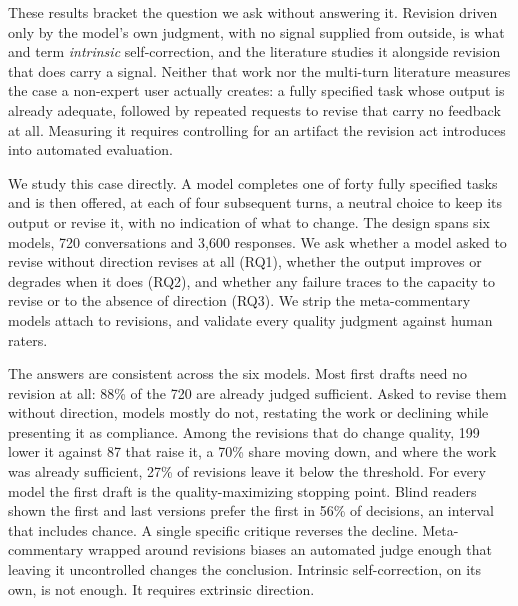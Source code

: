 These results bracket the question we ask without answering it. Revision driven only by the
model's own judgment, with no signal supplied from outside, is what
\citet{kamoi2024selfcorrection} and \citet{huang2024large} term \emph{intrinsic}
self-correction, and the literature studies it alongside revision that does carry a signal.
Neither that work nor the multi-turn literature measures the case a non-expert user
actually creates: a fully specified task whose output is already adequate, followed by
repeated requests to revise that carry no feedback at all. Measuring it requires
controlling for an artifact the revision act introduces into automated evaluation.

We study this case directly. A model completes one of forty fully specified tasks and is
then offered, at each of four subsequent turns, a neutral choice to keep its output or
revise it, with no indication of what to change. The design spans six models, 720
conversations and 3,600 responses. We ask whether a model asked to revise without direction
revises at all (RQ1), whether the output improves or degrades when it does (RQ2), and
whether any failure traces to the capacity to revise or to the absence of direction (RQ3).
We strip the meta-commentary models attach to revisions, and validate every quality
judgment against human raters.

The answers are consistent across the six models. Most first drafts need no revision at
all: 88\% of the 720 are already judged sufficient. Asked to revise them without direction,
models mostly do not, restating the work or declining while presenting it as compliance.
Among the revisions that do change quality, 199 lower it against 87 that raise it, a 70\%
share moving down, and where the work was already sufficient, 27\% of revisions leave it
below the threshold. For every model the first draft is the quality-maximizing stopping
point. Blind readers shown the first and last versions prefer the first in 56\% of
decisions, an interval that includes chance. A single specific critique reverses the
decline. Meta-commentary wrapped around revisions biases an automated judge enough that
leaving it uncontrolled changes the conclusion. Intrinsic self-correction, on its own, is
not enough. It requires extrinsic direction.
